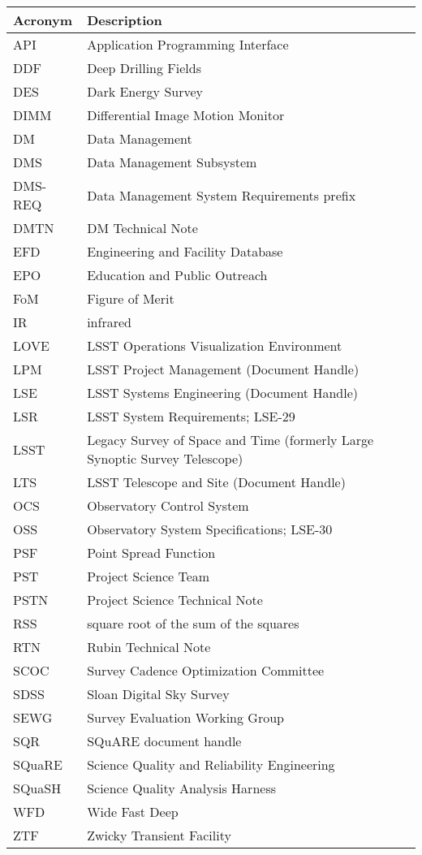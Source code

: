 \addtocounter{table}{-1}
\begin{longtable}{p{}p{}}\hline
\textbf{Acronym} & \textbf{Description}  \\\hline

API & Application Programming Interface \\\hline
DDF & Deep Drilling Fields \\\hline
DES & Dark Energy Survey \\\hline
DIMM & Differential Image Motion Monitor \\\hline
DM & Data Management \\\hline
DMS & Data Management Subsystem \\\hline
DMS-REQ & Data Management System Requirements prefix \\\hline
DMTN & DM Technical Note \\\hline
EFD & Engineering and Facility Database \\\hline
EPO & Education and Public Outreach \\\hline
FoM & Figure of Merit \\\hline
IR & infrared \\\hline
LOVE & LSST Operations Visualization Environment \\\hline
LPM & LSST Project Management (Document Handle) \\\hline
LSE & LSST Systems Engineering (Document Handle) \\\hline
LSR & LSST System Requirements; LSE-29 \\\hline
LSST & Legacy Survey of Space and Time (formerly Large Synoptic Survey Telescope) \\\hline
LTS & LSST Telescope and Site  (Document Handle) \\\hline
OCS & Observatory Control System \\\hline
OSS & Observatory System Specifications; LSE-30 \\\hline
PSF & Point Spread Function \\\hline
PST & Project Science Team \\\hline
PSTN & Project Science Technical Note \\\hline
RSS & square root of the sum of the squares \\\hline
RTN & Rubin Technical Note \\\hline
SCOC & Survey Cadence Optimization Committee \\\hline
SDSS & Sloan Digital Sky Survey \\\hline
SEWG & Survey Evaluation Working Group \\\hline
SQR & SQuARE document handle \\\hline
SQuaRE & Science Quality and Reliability Engineering \\\hline
SQuaSH & Science Quality Analysis Harness \\\hline
WFD & Wide Fast Deep \\\hline
ZTF & Zwicky Transient Facility \\\hline
\end{longtable}
